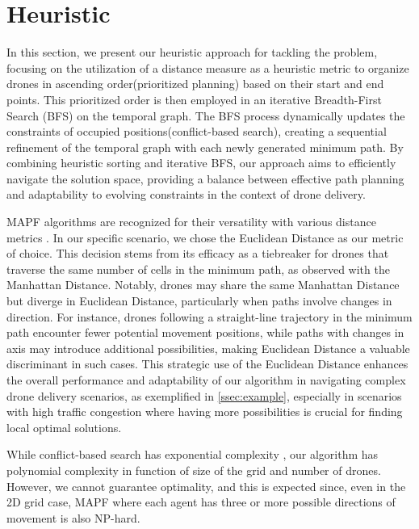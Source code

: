 \section[Heuristic]{Heuristic}
\label{Heuristic}

In this section, we present our heuristic approach for tackling the problem, focusing on the utilization of a distance measure as a heuristic metric to organize drones in ascending order(prioritized planning) based on their start and end points. This prioritized order is then employed in an iterative Breadth-First Search (BFS) on the temporal graph. The BFS process dynamically updates the constraints of occupied positions(conflict-based search), creating a sequential refinement of the temporal graph with each newly generated minimum path. By combining heuristic sorting and iterative BFS, our approach aims to efficiently navigate the solution space, providing a balance between effective path planning and adaptability to evolving constraints in the context of drone delivery.


MAPF algorithms are recognized for their versatility with various distance metrics \cite{Weise2023}. In our specific scenario, we chose the Euclidean Distance as our metric of choice. This decision stems from its efficacy as a tiebreaker for drones that traverse the same number of cells in the minimum path, as observed with the Manhattan Distance. Notably, drones may share the same Manhattan Distance but diverge in Euclidean Distance, particularly when paths involve changes in direction. For instance, drones following a straight-line trajectory in the minimum path encounter fewer potential movement positions, while paths with changes in axis may introduce additional possibilities, making Euclidean Distance a valuable discriminant in such cases. This strategic use of the Euclidean Distance enhances the overall performance and adaptability of our algorithm in navigating complex drone delivery scenarios, as exemplified in \ref{ssec:example}, especially in scenarios with high traffic congestion where having more possibilities is crucial for finding local optimal solutions.

While conflict-based search has exponential complexity \cite{DBLP:conf/socs/GordonFS21}, our algorithm has polynomial complexity in function of size of the grid and number of drones. However, we cannot guarantee optimality, and this is expected since, even in the 2D grid case, MAPF where each agent has three or more possible directions of movement is also NP-hard\cite{geft2023finegrained}.


